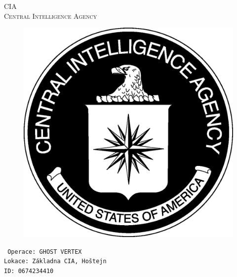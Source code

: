 \documentclass[a4paper, \fontheight]{article}
\begin{document}
	\begin{titlepage}
		\begin{center}		
			\textsc{{\fontsize{80}{0}\selectfont CIA}\\[2em]
				\Huge Central Intelligence Agency\\[2.5em]}
				
			\begin{figure}[H]
				\centering
				\includegraphics[scale=0.6]{sources/CIA_logo.eps}
			\end{figure}
		\end{center}	
		\vfill
		\noindent
		\texttt{\LARGE
				Operace: GHOST VERTEX\\[0.4em]
				Lokace: Základna CIA, Hoštejn\\[0.4em]
				ID: 0674234410}	
\end{titlepage} 
\end{document}
